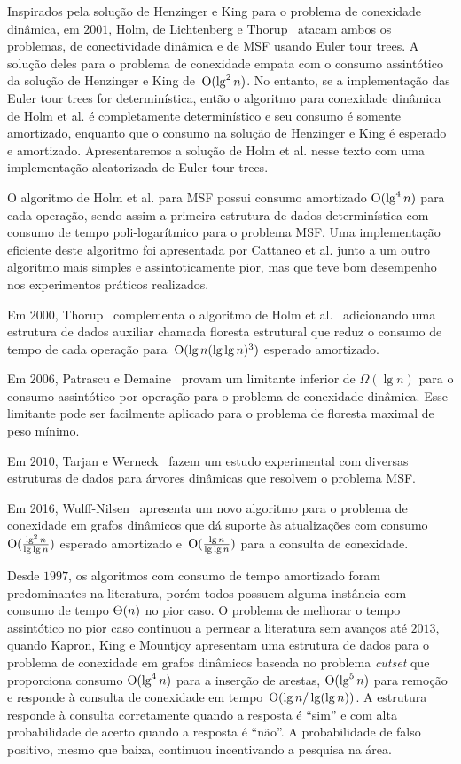 Inspirados pela solução de Henzinger e King para o problema de conexidade dinâmica, em $2001$, Holm, de Lichtenberg e Thorup~\cite{poly_log} atacam ambos os problemas, de conectividade dinâmica e de MSF usando Euler tour trees.
A solução deles para o problema de conexidade empata com o consumo assintótico da solução de Henzinger e King de~$\mathrm{O}(\lg^2 n)$.
No entanto, se a implementação das Euler tour trees for determinística, então o algoritmo para conexidade dinâmica de Holm et al. é completamente determinístico e seu consumo é somente amortizado,
enquanto que o consumo na solução de Henzinger e King é esperado e amortizado. 
Apresentaremos a solução de Holm et al. nesse texto com uma implementação aleatorizada de Euler tour trees.

O algoritmo de Holm et al. para MSF possui consumo amortizado $\mathrm{O}(\lg^4 n)$ para cada operação, sendo assim a primeira estrutura de dados determinística com consumo de tempo poli-logarítmico para o problema MSF. Uma implementação eficiente deste algoritmo foi apresentada por Cattaneo et al. \cite{xpstudy2002} junto a um outro algoritmo mais simples e assintoticamente pior, mas que teve bom desempenho nos experimentos práticos realizados.

Em $2000$, Thorup~\cite{Thorup2000} complementa o algoritmo de Holm et al.~\cite{poly_log} adicionando uma estrutura de dados auxiliar chamada floresta estrutural que reduz o consumo de tempo de cada operação para~$\mathrm{O}(\lg n(\lg\lg n)^3)$ esperado amortizado.

Em $2006$, Patrascu e Demaine~\cite{lowerBoundPatrascu} provam um limitante inferior de $\Omega(\lg n)$ para o consumo assintótico por operação para o problema de conexidade dinâmica.
Esse limitante pode ser facilmente aplicado para o problema de floresta maximal de peso mínimo.

Em $2010$, Tarjan e Werneck~\cite{tarjanWerneck2010} fazem um estudo experimental com diversas estruturas de dados para árvores dinâmicas que resolvem o problema MSF.

Em 2016, Wulff-Nilsen~\cite{Wulff-Nilsen2016} apresenta um novo algoritmo para o problema de conexidade em grafos dinâmicos que dá suporte às atualizações com consumo~$\mathrm{O}(\frac{\lg^2 n}{\lg \lg n})$ esperado amortizado e~$\mathrm{O}(\frac{\lg n}{\lg \lg n})$ para a consulta de conexidade.

Desde $1997$, os algoritmos com consumo de tempo amortizado foram predominantes na literatura, porém todos possuem alguma instância com consumo de tempo $\Theta(n)$ no pior caso.
O problema de melhorar o tempo assintótico no pior caso continuou a permear a literatura sem avanços até $2013$, quando Kapron, King e Mountjoy \cite{bruceM} apresentam uma estrutura de dados para o problema de conexidade em grafos dinâmicos baseada no problema \textit{cutset} que proporciona consumo $\mathrm{O}(\lg^4 n)$ para a inserção de arestas, $\mathrm{O}(\lg^5 n)$ para remoção e responde à consulta de conexidade em tempo~$\mathrm{O}(\lg n / \lg(\lg n))$.
A estrutura responde à consulta corretamente quando a resposta é “sim” e com alta probabilidade de acerto quando a resposta é “não”. A probabilidade de falso positivo, mesmo que baixa, continuou incentivando a pesquisa na área. 

